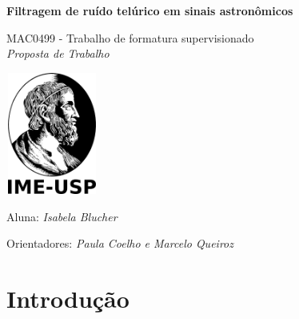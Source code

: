 \documentclass[10pt,twoside,a4paper]{article}
\begin{document}
\begin{center}
  \vspace*{3cm}
  
  \Huge
  \textbf{Filtragem de ruído telúrico em sinais astronômicos}

  \vspace{2.5cm}
  \LARGE
  MAC0499 - Trabalho de formatura supervisionado\\
  \vspace{0.3cm}
  \LARGE
  \textit{Proposta de Trabalho}

  
  \vspace{4.3cm}
  \includegraphics[height=4cm,width=3cm]{ime.png}
  \vspace{2cm}
  
  Aluna: \textit{Isabela Blucher}
  
  
  Orientadores: \textit{Paula Coelho e Marcelo Queiroz}
  
  \vspace{0.8cm}
  
  \Large
  
\end{center}


\newpage
\tableofcontents
\newpage
\section{Introdução}
\doublespacing
\end{document}
